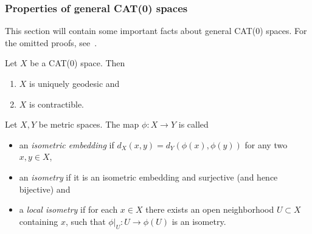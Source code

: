 
\subsubsection*{Properties of general CAT(0) spaces}

This section will contain some important facts about general CAT(0) spaces. For the omitted proofs, see\ \cite{MR1744486}.

\begin{prop}[{\cite[Prop II.1.4]{MR1744486}}]
  Let \(X\) be a CAT(0) space. Then
  \begin{enumerate}
  \item \(X\) is uniquely geodesic and
  \item \(X\) is contractible.
  \end{enumerate}
\end{prop}

\begin{defin}
  Let \(X,Y\) be metric spaces. The map \(\phi \colon X \to Y\) is called
  \begin{itemize}
  \item an \emph{isometric embedding} if \(d_X(x,y) = d_Y(\phi(x), \phi(y))\) for any two \(x,y \in X\),
  \item an \emph{isometry} if it is an isometric embedding and surjective (and hence bijective) and
  \item a \emph{local isometry} if for each \(x \in X\) there exists an open neighborhood \(U \subset X\) containing \(x\), such that \(\phi|_U \colon U \to \phi(U)\) is an isometry.
  \end{itemize}
\end{defin}


